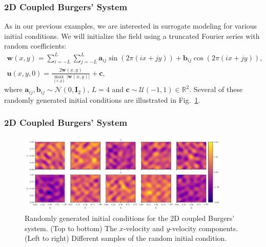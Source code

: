 \documentclass{beamer}
\theoremstyle{remark}
\newcommand{\mc}{\mathcal}
\begin{document}
\begin{frame}
\frametitle{2D Coupled Burgers' System}
As in our previous examples, we are interested in surrogate modeling for various initial conditions.
We will initialize the field using a truncated Fourier series with random coefficients:
\begin{equation}
    \begin{gathered}
        \bm{w}(x,y) = \sum_{i=-L}^L \sum_{j=-L}^L \bm{a}_{ij} \sin(2\pi\left(ix + jy\right)) + \bm{b}_{ij} \cos(2\pi\left(ix + jy\right)), \\
        \bm{u}(x, y, 0) = \frac{2\bm{w}(x,y)}{\max_{\left\{x,y\right\}} |\bm{w}(x,y)|} + \bm{c},
    \end{gathered}
    \label{eq:burger2d-initial}
\end{equation}
where $\bm{a}_{ij}, \bm{b}_{ij} \sim \mc N(0, \bm{I}_{2})$, $L=4$ and $\bm{c}\sim \mc U(-1, 1) \in \mathbb{R}^{2}$.
Several of these randomly generated initial conditions are illustrated in Fig.~\ref{fig:burgers2D-Initial}.
\end{frame}


\begin{frame}
\frametitle{2D Coupled Burgers' System}
\begin{figure}[H]
    \centering
    \includegraphics[width=0.9\textwidth]{Fig16.png}
    \caption{Randomly generated initial conditions for the 2D coupled Burgers' system. (Top to bottom) The $x$-velocity and $y$-velocity components. (Left to right) Different samples of the random initial condition.}
    \label{fig:burgers2D-Initial}
\end{figure}
\end{frame}
\end{document}
